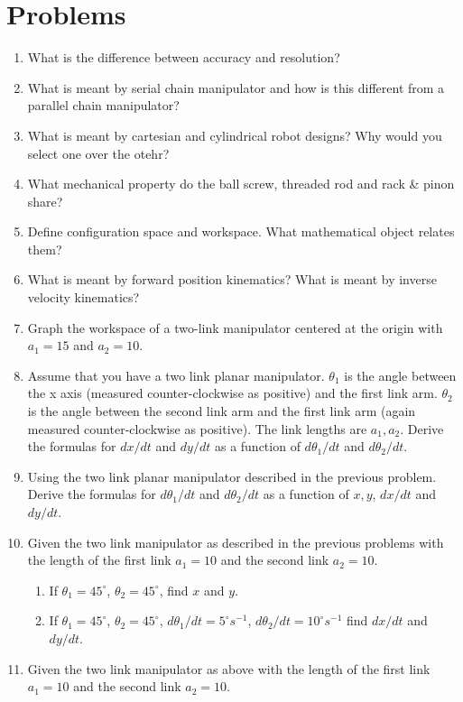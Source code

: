 \hypertarget{problems}{%
\section{Problems}\label{problems}}

\begin{enumerate}
\item
  What is the difference between accuracy and resolution?
\item
  What is meant by serial chain manipulator and how is this different
  from a parallel chain manipulator?
\item
  What is meant by cartesian and cylindrical robot designs? Why would
  you select one over the otehr?
\item
  What mechanical property do the ball screw, threaded rod and rack \&
  pinon share?
\item
  Define configuration space and workspace. What mathematical object
  relates them?
\item
  What is meant by forward position kinematics? What is meant by inverse
  velocity kinematics?
\item
  Graph the workspace of a two-link manipulator centered at the origin
  with \(a_1 = 15\) and \(a_2 = 10\).
\item
  Assume that you have a two link planar manipulator. \(\theta_1\) is
  the angle between the x axis (measured counter-clockwise as positive)
  and the first link arm. \(\theta_2\) is the angle between the second
  link arm and the first link arm (again measured counter-clockwise as
  positive). The link lengths are \(a_1, a_2\). Derive the formulas for
  \(dx/dt\) and \(dy/dt\) as a function of \(d\theta_1/dt\) and
  \(d\theta_2/dt\).
\item
  Using the two link planar manipulator described in the previous
  problem. Derive the formulas for \(d\theta_1/dt\) and \(d\theta_2/dt\)
  as a function of \(x, y\), \(dx/dt\) and \(dy/dt\).
\item
  Given the two link manipulator as described in the previous problems
  with the length of the first link \(a_1 = 10\) and the second link
  \(a_2 = 10\).

  \begin{enumerate}
  \def\labelenumii{\alph{enumii}.}
  \tightlist
  \item
    If \(\theta_1 = 45^\circ\), \(\theta_2 = 45^\circ\), find \(x\) and
    \(y\).
  \item
    If \(\theta_1 = 45^\circ\), \(\theta_2 = 45^\circ\),
    \(d\theta_1/dt = 5^\circ s^{-1}\),
    \(d\theta_2/dt = 10^\circ s^{-1}\) find \(dx/dt\) and \(dy/dt\).
  \end{enumerate}
\item
  Given the two link manipulator as above with the length of the first
  link \(a_1 = 10\) and the second link \(a_2 = 10\).


\end{enumerate}
